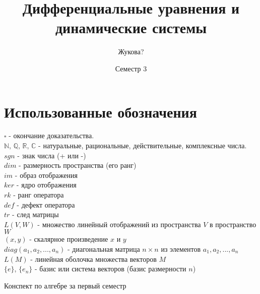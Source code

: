 \documentclass[a4paper]{book}
\title{Дифференциальные уравнения и динамические системы}
\date{Семестр 3}
\author{Жукова?}
\begin{document}
\maketitle
\tableofcontents
\newpage


\section{Использованные обозначения}
$\square$ - окончание доказательства. \\
$\mathbb N,\,\mathbb Q,\,\mathbb R,\,\mathbb C$ - натуральные, рациональные,
действительные, комплексные числа.\\
$sgn$ - знак числа (+ или -)\\
$dim$ - размерность пространства (его ранг)\\
$im$ - образ отображения\\
$ker$ - ядро отображения\\
$rk$ - ранг оператора\\
$def$ - дефект оператора\\
$tr$ - след матрицы\\
$L(V,W)$ - множество линейный отображений из пространства $V$ в 
пространство $W$\\
$(x,y)$ - скалярное произведение $x$ и $y$\\
$diag(a_1,a_2,...,a_n)$ - диагональная матрица $n\times n$ из элементов
$a_1,a_2,...,a_n$\\
$L(M)$ - линейная оболочка множества векторов $M$\\
$\{e\}$, $\{e_n\}$ - базис или система векторов (базис размерности $n$)\\

\begin{thebibliography}{}
Конспект по алгебре за первый семестр
\end{thebibliography}
\end{document}
